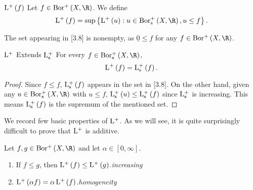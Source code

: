 \documentclass[pmath450]{subfiles}
\begin{document}
    \begin{notation}{$\operatorname{L^+}\left( f \right)$}
        Let $f\in\borplus\left( X,\R \right)$. We define
        \begin{equation}
            \lplus\left( f \right) = \sup\left\lbrace \lplus\left( u \right): u\in\borpluss\left( X,\R \right),u\leq f \right\rbrace.
        \end{equation}
    \end{notation}

    \np The set appearing in [3.8] is nonempty, as $\underline{0}\leq f$ for any $f\in\borplus\left( X,\R \right)$.

    \begin{prop}{$\operatorname{L^+}$ Extends $\operatorname{L^+_s}$}
        For every $f\in\borpluss\left( X,\R \right)$,
        \begin{equation*}
            \operatorname{L^+}\left( f \right) = \operatorname{L^+_s}\left( f \right).
        \end{equation*}
    \end{prop}

    \begin{proof}
        Since $f\leq f$, $\operatorname{L^+_s}\left( f \right)$ appears in the set in [3.8]. On the other hand, given any $u\in\borpluss\left( X,\R \right)$ with $u\leq f$, $\operatorname{L^+_s}\left( u \right)\leq\operatorname{L^+_s}\left( f \right)$ since $\operatorname{L^+_s}$ is increasing. This means $\operatorname{L^+_s}\left( f \right)$ is the supremum of the mentioned set.
    \end{proof}

    \np We record few basic properties of $\operatorname{L^+}$. As we will see, it is quite surprisingly difficult to prove that $\operatorname{L^+}$ is additive.

    \begin{prop}{}
        Let $f,g\in\borplus\left( X,\R \right)$ and let $\alpha\in\left[ 0,\infty \right]$.
        \begin{enumerate}
            \item If $f\leq g$, then $\operatorname{L^+}\left( f \right)\leq\operatorname{L^+}\left( g \right)$.\hfill\textit{increasing}
            \item $\operatorname{L^+}\left( \alpha f \right)=\alpha\operatorname{L^+}\left( f \right)$.\hfill\textit{homogeneity}
        \end{enumerate}
    \end{prop}
\end{document}
